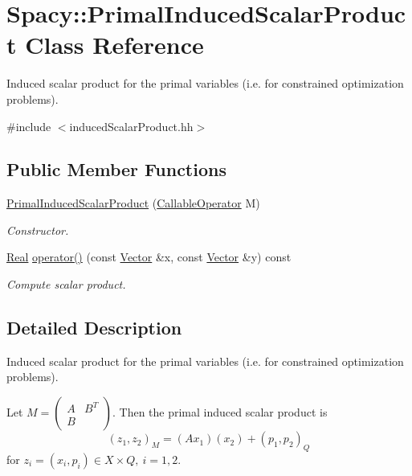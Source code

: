 \hypertarget{classSpacy_1_1PrimalInducedScalarProduct}{}\section{Spacy\+:\+:Primal\+Induced\+Scalar\+Product Class Reference}
\label{classSpacy_1_1PrimalInducedScalarProduct}


Induced scalar product for the primal variables (i.\+e. for constrained optimization problems).  




{\ttfamily \#include $<$induced\+Scalar\+Product.\+hh$>$}

\subsection*{Public Member Functions}
\begin{DoxyCompactItemize}
\item 
\hyperlink{classSpacy_1_1PrimalInducedScalarProduct_a165fcad280603bf2931dac7df467953a_a165fcad280603bf2931dac7df467953a}{Primal\+Induced\+Scalar\+Product} (\hyperlink{group__SpacyGroup_ga2b74020d806ad800795cdd97dab3466f_ga2b74020d806ad800795cdd97dab3466f}{Callable\+Operator} M)
\begin{DoxyCompactList}\small\item\em Constructor. \end{DoxyCompactList}\item 
\hyperlink{classSpacy_1_1Real}{Real} \hyperlink{classSpacy_1_1PrimalInducedScalarProduct_aee0ed0c7fe70e8630cbf77702d73c97c_aee0ed0c7fe70e8630cbf77702d73c97c}{operator()} (const \hyperlink{classSpacy_1_1Vector}{Vector} \&x, const \hyperlink{classSpacy_1_1Vector}{Vector} \&y) const 
\begin{DoxyCompactList}\small\item\em Compute scalar product. \end{DoxyCompactList}\end{DoxyCompactItemize}


\subsection{Detailed Description}
Induced scalar product for the primal variables (i.\+e. for constrained optimization problems). 

Let $ M = \left( \begin{array}{ccc} A & B^T \\ B & \end{array} \right)$. Then the primal induced scalar product is \[ (z_1,z_2)_M = (Ax_1)(x_2) + (p_1,p_2)_Q \] for $z_i = (x_i,p_i)\in X\times Q,\ i=1,2$. 

